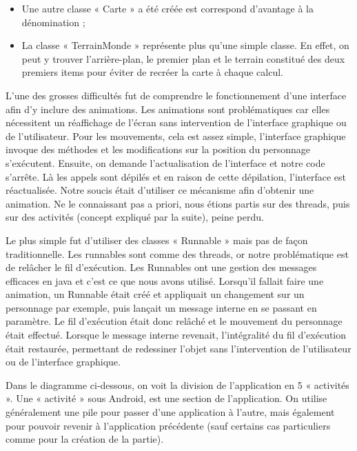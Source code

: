 \documentclass{report}
\begin{document}
\begin{itemize}
\item Une autre classe « Carte » a été créée est correspond d’avantage à la dénomination ;
\item La classe « TerrainMonde » représente plus qu’une simple classe. En effet, on peut y trouver l’arrière-plan, le premier plan et le terrain constitué des deux premiers items pour éviter de recréer la carte à chaque calcul.
\end{itemize}
L’une des grosses difficultés fut de comprendre le fonctionnement d’une interface afin d’y inclure des animations. Les animations sont problématiques car elles nécessitent un réaffichage de l’écran sans intervention de l’interface graphique ou de l’utilisateur. Pour les mouvements, cela est assez simple, l’interface graphique invoque des méthodes et les modifications sur la position du personnage s’exécutent. Ensuite, on demande l’actualisation de l’interface et notre code s'arrête. Là les appels sont dépilés et en raison de cette dépilation, l’interface est réactualisée. Notre soucis était d’utiliser ce mécanisme afin d’obtenir une animation. Ne le connaissant pas a priori, nous étions partis sur des threads, puis sur des activités (concept expliqué par la suite), peine perdu.

Le plus simple fut d’utiliser des classes « Runnable » mais pas de façon traditionnelle. Les runnables sont comme des threads, or notre problématique est de relâcher le fil d'exécution. Les Runnables ont une gestion des messages efficaces en java et c’est ce que nous avons utilisé. Lorsqu’il fallait faire une animation, un Runnable était créé et appliquait un changement sur un personnage par exemple, puis lançait un message interne en se passant en paramètre. Le fil d'exécution était donc relâché et le mouvement du personnage était effectué.
Lorsque le message interne revenait, l’intégralité du fil d'exécution était restaurée, permettant de redessiner l’objet sans l’intervention de l’utilisateur ou de l’interface graphique.

Dans le diagramme ci-dessous, on voit la division de l’application en 5 « activités ». 
Une « activité » sous Android, est une section de l’application. On utilise généralement une pile pour passer d’une application à l’autre, mais également pour pouvoir revenir à l’application précédente (sauf certains cas particuliers comme pour la création de la partie).
\end{document}
